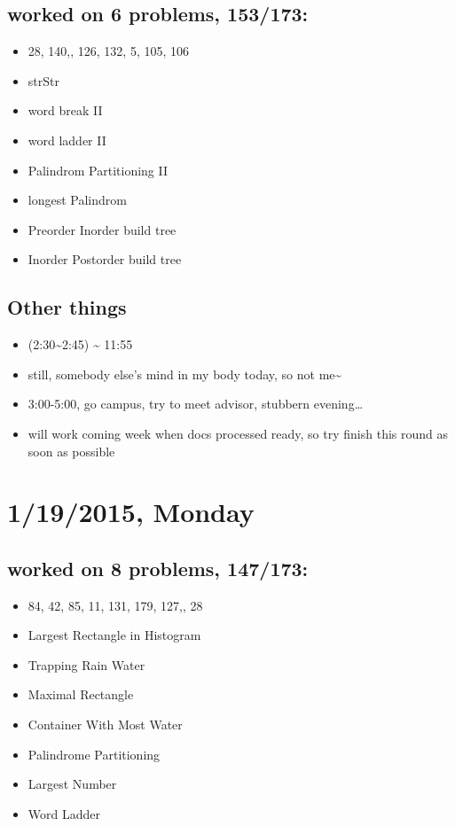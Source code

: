 \documentclass[9pt,b5paper]{article}
\begin{document}
\subsection{worked on 6 problems, 153/173:}
\label{sec-6-1}
\begin{itemize}
\item 28, 140,, 126, 132, 5, 105, 106
\item strStr
\item word break II
\item word ladder II
\item Palindrom Partitioning II
\item longest Palindrom
\item Preorder Inorder build tree
\item Inorder Postorder build tree
\end{itemize}
\subsection{Other things}
\label{sec-6-2}
\begin{itemize}
\item (2:30\textasciitilde{}2:45) \textasciitilde{} 11:55
\item still, somebody else's mind in my body today, so not me\textasciitilde{}
\item 3:00-5:00, go campus, try to meet advisor, stubbern evening\ldots{}
\item will work coming week when docs processed ready, so try finish this round as soon as possible
\end{itemize}
\section{1/19/2015, Monday}
\label{sec-7}
\subsection{worked on 8 problems, 147/173:}
\label{sec-7-1}
\begin{itemize}
\item 84, 42, 85, 11, 131, 179, 127,, 28
\item Largest Rectangle in Histogram
\item Trapping Rain Water
\item Maximal Rectangle
\item Container With Most Water
\item Palindrome Partitioning
\item Largest Number
\item Word Ladder
\end{itemize}
\end{document}
